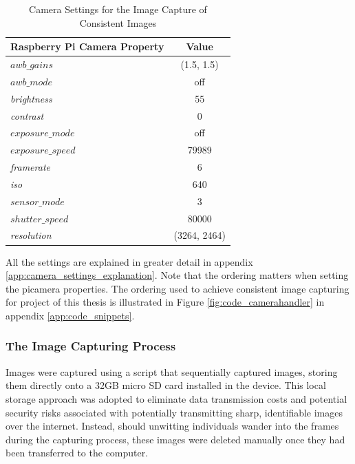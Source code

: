 \begin{table}[H]
    \centering
    \renewcommand{\arraystretch}{1.5} %
    \setlength{\tabcolsep}{1em}
    \begin{tabular}{|l|c|}
        \hline
        \rowcolor{gray!25}
        \textbf{Raspberry Pi Camera Property} & \textbf{Value} \\ \hline
        $awb\_gains$                & (1.5, 1.5)     \\ \hline
        $awb\_mode$                 & off            \\ \hline
        \textit{brightness}         & 55             \\ \hline
        \textit{contrast}           & 0              \\ \hline
        $exposure\_mode$            & off            \\ \hline
        $exposure\_speed$           & 79989          \\ \hline
        \textit{framerate}          & 6              \\ \hline
        \textit{iso}                & 640            \\ \hline
        $sensor\_mode$              & 3              \\ \hline
        $shutter\_speed$            & 80000          \\ \hline
        \textit{resolution}         & (3264, 2464)   \\ \hline
    \end{tabular}
    \caption{Camera Settings for the Image Capture of Consistent Images}
    \label{tab:picamera_settings}
\end{table}

All the settings are explained in greater detail in appendix \ref{app:camera_settings_explanation}. Note that the ordering matters when setting the picamera properties. The ordering used to achieve consistent image capturing for project of this thesis is illustrated in Figure \ref{fig:code_camerahandler} in appendix \ref{app:code_snippets}.


\subsubsection{The Image Capturing Process}
\label{sec:image_capture}
Images were captured using a script that sequentially captured images, storing them directly onto a 32GB micro SD card installed in the device. This local storage approach was adopted to eliminate data transmission costs and potential security risks associated with potentially transmitting sharp, identifiable images over the internet. Instead, should unwitting individuals wander into the frames during the capturing process, these images were deleted manually once they had been transferred to the computer. 

